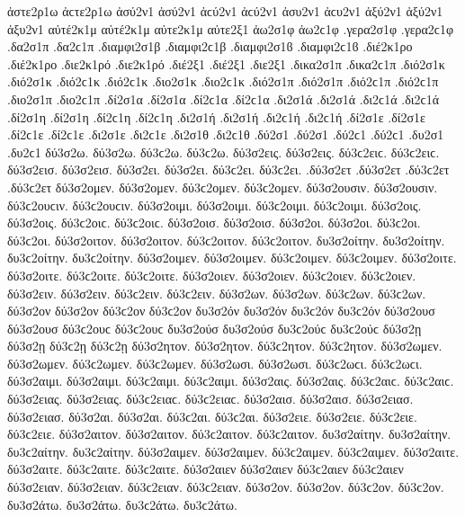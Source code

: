 {ἀστε2ρ1ω ἀϲτε2ρ1ω   %
ἀσύ2ν1 ἀσύ2ν1 ἀϲύ2ν1 ἀϲύ2ν1   %
ἀσυ2ν1 ἀϲυ2ν1
ἀξύ2ν1 ἀξύ2ν1   %
ἀξυ2ν1
αὐτέ2κ1μ αὐτέ2κ1μ   %
αὐτε2κ1μ
αὐτε2ξ1   %
ἀω2σ1φ ἀω2ϲ1φ   %
.γερα2σ1φ .γερα2ϲ1φ   %
.δα2σ1π .δα2ϲ1π   %
.διαμφι2σ1β .διαμφι2ϲ1β .διαμφι2σ1ϐ .διαμφι2ϲ1ϐ %
.διέ2κ1ρο .διέ2κ1ρο   %
.διε2κ1ρό .διε2κ1ρό
.διέ2ξ1 .διέ2ξ1   %
.διε2ξ1   %
.δικα2σ1π .δικα2ϲ1π   %
.διό2σ1κ .διό2σ1κ .διό2ϲ1κ .διό2ϲ1κ   %
.διο2σ1κ .διο2ϲ1κ
.διό2σ1π .διό2σ1π .διό2ϲ1π .διό2ϲ1π   %
.διο2σ1π .διο2ϲ1π
.δί2σ1α .δί2σ1α .δί2ϲ1α .δί2ϲ1α   %
.δι2σ1ά .δι2σ1ά .δι2ϲ1ά .δι2ϲ1ά
.δί2σ1η .δί2σ1η .δί2ϲ1η .δί2ϲ1η   %
.δι2σ1ή .δι2σ1ή .δι2ϲ1ή .δι2ϲ1ή
.δί2σ1ε .δί2σ1ε .δί2ϲ1ε .δί2ϲ1ε   %
.δι2σ1ε .δι2ϲ1ε
.δι2σ1θ .δι2ϲ1θ   %
.δύ2σ1 .δύ2σ1 .δύ2ϲ1 .δύ2ϲ1   %
.δυ2σ1 .δυ2ϲ1
%
δύ3σ2ω. δύ3σ2ω. δύ3ϲ2ω. δύ3ϲ2ω.   %
δύ3σ2εις. δύ3σ2εις. δύ3ϲ2ειϲ. δύ3ϲ2ειϲ.
δύ3σ2εισ. δύ3σ2εισ.
δύ3σ2ει. δύ3σ2ει. δύ3ϲ2ει. δύ3ϲ2ει.
.δύ3σ2ετ .δύ3σ2ετ .δύ3ϲ2ετ .δύ3ϲ2ετ
δύ3σ2ομεν. δύ3σ2ομεν. δύ3ϲ2ομεν. δύ3ϲ2ομεν.
δύ3σ2ουσιν. δύ3σ2ουσιν. δύ3ϲ2ουϲιν. δύ3ϲ2ουϲιν.
δύ3σ2οιμι. δύ3σ2οιμι. δύ3ϲ2οιμι. δύ3ϲ2οιμι.
δύ3σ2οις. δύ3σ2οις. δύ3ϲ2οιϲ. δύ3ϲ2οιϲ.
δύ3σ2οισ. δύ3σ2οισ.
δύ3σ2οι. δύ3σ2οι. δύ3ϲ2οι. δύ3ϲ2οι.
δύ3σ2οιτον. δύ3σ2οιτον. δύ3ϲ2οιτον. δύ3ϲ2οιτον.
δυ3σ2οίτην. δυ3σ2οίτην. δυ3ϲ2οίτην. δυ3ϲ2οίτην.
δύ3σ2οιμεν. δύ3σ2οιμεν. δύ3ϲ2οιμεν. δύ3ϲ2οιμεν.
δύ3σ2οιτε. δύ3σ2οιτε. δύ3ϲ2οιτε. δύ3ϲ2οιτε.
δύ3σ2οιεν. δύ3σ2οιεν. δύ3ϲ2οιεν. δύ3ϲ2οιεν.
δύ3σ2ειν. δύ3σ2ειν. δύ3ϲ2ειν. δύ3ϲ2ειν.
δύ3σ2ων. δύ3σ2ων. δύ3ϲ2ων. δύ3ϲ2ων. δύ3σ2ον δύ3σ2ον δύ3ϲ2ον δύ3ϲ2ον δυ3σ2όν δυ3σ2όν δυ3ϲ2όν δυ3ϲ2όν
δύ3σ2ουσ δύ3σ2ουσ δύ3ϲ2ουϲ δύ3ϲ2ουϲ δυ3σ2ούσ δυ3σ2ούσ δυ3ϲ2ούϲ δυ3ϲ2ούϲ
δύ3σ2ῃ δύ3σ2ῃ δύ3ϲ2ῃ δύ3ϲ2ῃ
δύ3σ2ητον. δύ3σ2ητον. δύ3ϲ2ητον. δύ3ϲ2ητον.
δύ3σ2ωμεν. δύ3σ2ωμεν. δύ3ϲ2ωμεν. δύ3ϲ2ωμεν.
δύ3σ2ωσι. δύ3σ2ωσι. δύ3ϲ2ωϲι. δύ3ϲ2ωϲι.
δύ3σ2αιμι. δύ3σ2αιμι. δύ3ϲ2αιμι. δύ3ϲ2αιμι.
δύ3σ2αις. δύ3σ2αις. δύ3ϲ2αιϲ. δύ3ϲ2αιϲ. δύ3σ2ειας. δύ3σ2ειας. δύ3ϲ2ειαϲ. δύ3ϲ2ειαϲ.
δύ3σ2αισ. δύ3σ2αισ. δύ3σ2ειασ. δύ3σ2ειασ.
δύ3σ2αι. δύ3σ2αι. δύ3ϲ2αι. δύ3ϲ2αι. δύ3σ2ειε. δύ3σ2ειε. δύ3ϲ2ειε. δύ3ϲ2ειε.
δύ3σ2αιτον. δύ3σ2αιτον. δύ3ϲ2αιτον. δύ3ϲ2αιτον.
δυ3σ2αίτην. δυ3σ2αίτην. δυ3ϲ2αίτην. δυ3ϲ2αίτην.
δύ3σ2αιμεν. δύ3σ2αιμεν. δύ3ϲ2αιμεν. δύ3ϲ2αιμεν.
δύ3σ2αιτε. δύ3σ2αιτε. δύ3ϲ2αιτε. δύ3ϲ2αιτε.
δύ3σ2αιεν δύ3σ2αιεν δύ3ϲ2αιεν δύ3ϲ2αιεν δύ3σ2ειαν. δύ3σ2ειαν. δύ3ϲ2ειαν. δύ3ϲ2ειαν.
δύ3σ2ον. δύ3σ2ον. δύ3ϲ2ον. δύ3ϲ2ον.
δυ3σ2άτω. δυ3σ2άτω. δυ3ϲ2άτω. δυ3ϲ2άτω.
}
